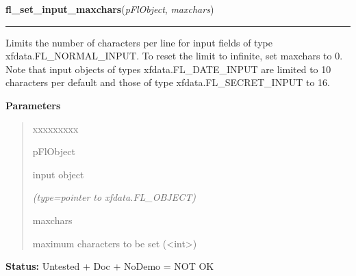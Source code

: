 \hspace{.8\funcindent}\begin{boxedminipage}{\funcwidth}

    \raggedright \textbf{fl\_set\_input\_maxchars}(\textit{pFlObject}, \textit{maxchars})

    \vspace{-1.5ex}

    \rule{\textwidth}{0.5\fboxrule}
\setlength{\parskip}{2ex}
    Limits the number of characters per line for input fields of type 
    xfdata.FL\_NORMAL\_INPUT. To reset the limit to infinite, set maxchars 
    to 0. Note that input objects of types xfdata.FL\_DATE\_INPUT are 
    limited to 10 characters per default and those of type 
    xfdata.FL\_SECRET\_INPUT to 16.

\setlength{\parskip}{1ex}
      \textbf{Parameters}
      \vspace{-1ex}

      \begin{quote}
        \begin{Ventry}{xxxxxxxxx}

          \item[pFlObject]

          input object

            {\it (type=pointer to xfdata.FL\_OBJECT)}

          \item[maxchars]

          maximum characters to be set ({\textless}int{\textgreater})

        \end{Ventry}

      \end{quote}

\textbf{Status:} Untested + Doc + NoDemo = NOT OK



    \end{boxedminipage}

    \label{xformslib:flinput:fl_set_input_format}

    \vspace{0.5ex}


